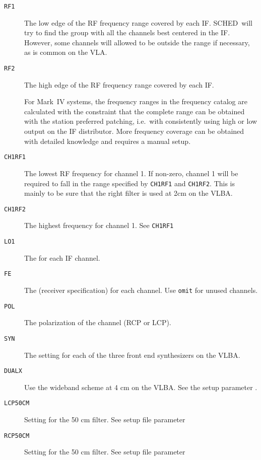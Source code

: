 \documentclass{report}
\newcommand{\schedb}{{\sc SCHED~}}
\begin{document}
\begin{description}
\item [{\tt RF1}] The low edge of the RF frequency range covered by
each IF.  \schedb will try to find the group with all the channels
best centered in the IF.  However, some channels will allowed to be
outside the range if necessary, as is common on the VLA.

\item [{\tt RF2}] The high edge of the RF frequency range covered by
each IF.

For Mark~IV systems, the frequency ranges in the frequency catalog
are calculated with the constraint that the complete range can be
obtained with the station preferred patching, i.e.\ with consistently
using high or low output on the IF distributor.  More frequency
coverage can be obtained with detailed knowledge and requires a manual
setup.

\item [{\tt CH1RF1}] The lowest RF frequency for channel 1.  If
non-zero, channel 1 will be required to fall in the range specified by
{\tt CH1RF1} and {\tt CH1RF2}.  This is mainly to be sure that the
right filter is used at 2cm on the VLBA.

\item [{\tt CH1RF2}] The highest frequency for channel 1.  See
{\tt CH1RF1}

\item [{\tt LO1}] The  for each IF
channel.

\item [{\tt FE}] The  (receiver
specification) for each channel.  Use {\tt omit} for unused channels.

\item [{\tt POL}] The polarization of the channel (RCP or LCP).

\item [{\tt SYN}] The  setting for each
of the three front end synthesizers on the VLBA.

\item [{\tt DUALX}] Use the wideband scheme at 4 cm on the VLBA.  See
the setup parameter .

\item [{\tt LCP50CM}] Setting for the 50 cm filter.  See setup file
parameter 

\item [{\tt RCP50CM}] Setting for the 50 cm filter.  See setup file
parameter 


\end{description}
\end{document}

